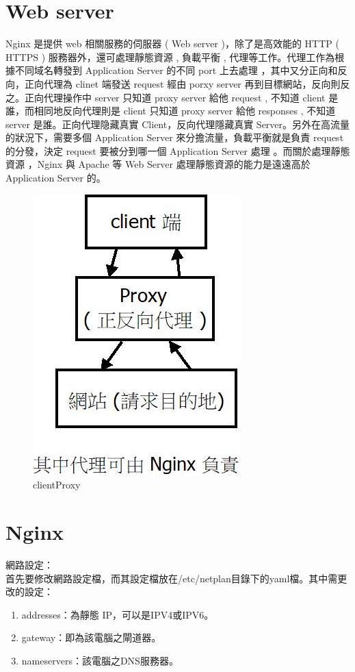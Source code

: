 \documentclass[14pt,a4paper]{report}  %
\begin{document}
\section{Web server}
 Nginx 是提供 web 相關服務的伺服器 ( Web server )，除了是高效能的 HTTP ( HTTPS ) 服務器外，還可處理靜態資源 , 負載平衡 , 代理等工作。代理工作為根據不同域名轉發到 Application Server 的不同 port 上去處理 ，其中又分正向和反向，正向代理為 clinet 端發送 request 經由 porxy server 再到目標網站，反向則反之。正向代理操作中 server 只知道 proxy server  給他 request , 不知道 client 是誰，而相同地反向代理則是 client 只知道 proxy server 給他 responses , 不知道 server 是誰。正向代理隐藏真實 Client，反向代理隱藏真實 Server。另外在高流量的狀況下，需要多個 Application Server 來分擔流量，負載平衡就是負責 request 的分發，決定 request 要被分到哪一個 Application Server 處理 。而關於處理靜態資源 ，Nginx 與 Apache 等 Web Server 處理靜態資源的能力是遠遠高於 Application Server 的。\\
 \begin{figure}[hbt!]
\begin{center}
\includegraphics[scale=0.8]{clientProxy}
\caption{\Large clientProxy}
\label{clientProxy}
\end{center}
\end{figure}
\newpage

\section{Nginx}
\hspace{-1.7em} 網路設定：\\
 首先要修改網路設定檔，而其設定檔放在/etc/netplan目錄下的yaml檔。其中需更改的設定：
\begin{enumerate}
\item addresses：為靜態 IP，可以是IPV4或IPV6。
\item gateway：即為該電腦之閘道器。
\item nameservers：該電腦之DNS服務器。
\end{enumerate}
\end{document}
